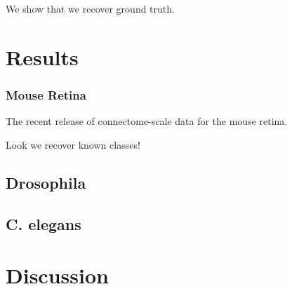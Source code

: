 \documentclass{article}
\begin{document}
We show that we recover ground truth. 


\section{Results}

\subsubsection{Mouse Retina}
The recent release of connectome-scale data for the mouse retina. 

Look we recover known classes! 

\subsection{Drosophila}

\subsection{C. elegans}


\section{Discussion}
\end{document}
